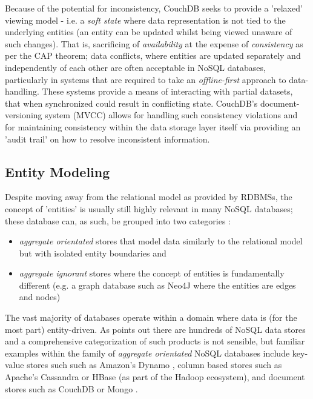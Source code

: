 Because of the potential for inconsistency, CouchDB seeks to provide a 'relaxed' viewing model - i.e. a \textit{soft state} where data representation is not tied to the underlying entities (an entity can be updated whilst being viewed unaware of such changes). That is, sacrificing of \textit{availability} at the expense of \textit{consistency} as per the CAP theorem; data conflicts, where entities are updated separately and independently of each other are often acceptable in NoSQL databases, particularly in systems that are required to take an \textit{offline-first} approach to data-handling. These systems provide a means of interacting with partial datasets, that when synchronized could result in conflicting state. CouchDB's document-versioning system (MVCC) allows for handling such consistency violations and for maintaining consistency within the data storage layer itself via providing an 'audit trail' on how to resolve inconsistent information.

\subsection{Entity Modeling}
Despite moving away from the relational model as provided by RDBMSs, the concept of 'entities' is usually still highly relevant in many NoSQL databases; these database can, as such, be grouped into two categories \cite{fowlerAggregate}:

\begin{itemize}
    \item \textit{aggregate orientated} stores that model data similarly to the relational model but with isolated entity boundaries and
    \item \textit{aggregate ignorant} stores where the concept of entities is fundamentally different (e.g. a graph database such as Neo4J \cite{xxx} where the entities are edges and nodes)
\end{itemize}

The vast majority of databases operate within a domain where data is (for the most part) entity-driven. As \cite{GANESHCHANDRA201513} points out there are hundreds of NoSQL data stores and a comprehensive categorization of such products is not sensible, but familiar examples within the family of \textit{aggregate orientated} NoSQL databases include key-value stores such such as Amazon's Dynamo \cite{xxx}, column based stores such as Apache's Cassandra \cite{xxx} or HBase \cite{xxx} (as part of the Hadoop ecosystem), and document stores such as CouchDB or Mongo \cite{xxx}.

